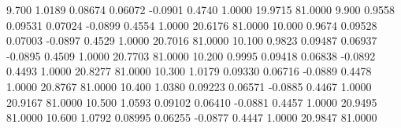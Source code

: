    9.700   1.0189   0.08674   0.06072  -0.0901   0.4740   1.0000  19.9715  81.0000
   9.900   0.9558   0.09531   0.07024  -0.0899   0.4554   1.0000  20.6176  81.0000
  10.000   0.9674   0.09528   0.07003  -0.0897   0.4529   1.0000  20.7016  81.0000
  10.100   0.9823   0.09487   0.06937  -0.0895   0.4509   1.0000  20.7703  81.0000
  10.200   0.9995   0.09418   0.06838  -0.0892   0.4493   1.0000  20.8277  81.0000
  10.300   1.0179   0.09330   0.06716  -0.0889   0.4478   1.0000  20.8767  81.0000
  10.400   1.0380   0.09223   0.06571  -0.0885   0.4467   1.0000  20.9167  81.0000
  10.500   1.0593   0.09102   0.06410  -0.0881   0.4457   1.0000  20.9495  81.0000
  10.600   1.0792   0.08995   0.06255  -0.0877   0.4447   1.0000  20.9847  81.0000
